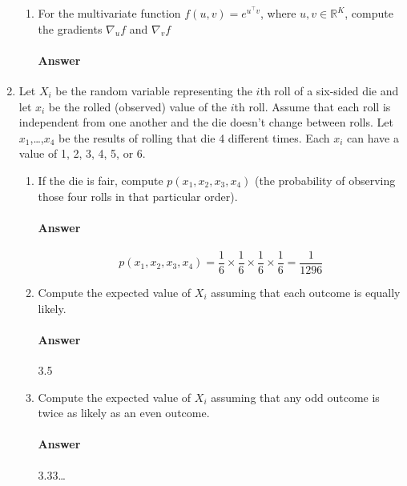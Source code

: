 \documentclass[12pt]{article}
\begin{document}
\begin{enumerate}
\begin{enumerate}
  \item For the multivariate function $f(u,v) = e^{u^{\top}v}$, where $u, v \in \mathbb{R}^K$,
        compute the gradients $\nabla_u f$ and $\nabla_v f$ \\
  \vspace{-2.5em}
  \paragraph{Answer}
  \end{enumerate}

\item Let $X_i$ be the random variable representing the $i$th roll of a six-sided die
      and let $x_i$ be the rolled (observed) value of the $i$th roll. Assume that each
      roll is independent from one another and the die doesn't change between rolls.
      Let $x_1$,\dots,$x_4$ be the results of rolling that die 4 different times. Each 
      $x_i$ can have a value of 1, 2, 3, 4, 5, or 6.
  \begin{enumerate}
  \item If the die is fair, compute $p(x_1, x_2, x_3, x_4)$ (the probability of observing
        those four rolls in that particular order).\\
  \vspace{-2.5em}
  \paragraph{Answer} $$p(x_1, x_2, x_3, x_4) = \frac{1}{6} \times \frac{1}{6} \times \frac{1}{6} \times \frac{1}{6} = \frac{1}{1296}$$

  \item Compute the expected value of $X_i$ assuming that each outcome is equally likely.\\
  \vspace{-2.5em}
  \paragraph{Answer} 3.5

  \item Compute the expected value of $X_i$ assuming that any odd outcome is twice as likely as an even outcome.\\
  \vspace{-2.5em}
  \paragraph{Answer} 3.33\dots
  \end{enumerate}

\end{enumerate}
\end{document}

